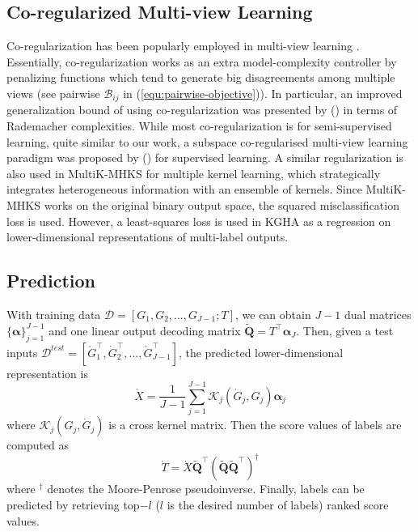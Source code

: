 \documentclass[a4paper]{article}
\begin{document}
\subsection{Co-regularized Multi-view Learning}
Co-regularization has been popularly employed in multi-view learning \cite{Farquhar_2005_NIPS,Brefeld_2006_ICML,Rosenberg_2007_AISTATS}. Essentially, co-regularization 
works as an extra model-complexity controller by penalizing functions which tend to generate big disagreements among multiple views (see pairwise $\mathcal{B}_{ij}$ in (\ref{equ:pairwise-objective})).   
In particular, an improved generalization bound of using co-regularization was presented by \citeauthor{Rosenberg_2007_AISTATS} (\citeyear{Rosenberg_2007_AISTATS}) in terms of Rademacher complexities.    
While most co-regularization is for semi-supervised learning, quite similar to our work,  a subspace co-regularised multi-view learning paradigm was proposed by \citeauthor{Guo_2012_ICML} (\citeyear{Guo_2012_ICML})
for supervised learning.
A similar regularization is also used in MultiK-MHKS \cite{MKL} for multiple kernel learning, which strategically integrates heterogeneous information with an 
ensemble of kernels. Since MultiK-MHKS works on the original binary output space, the squared misclassification loss is used. However, a least-squares loss is 
used in KGHA as a regression on lower-dimensional representations of multi-label outputs.      

\subsection{Prediction}
With training data $\mathcal{D}=[G_1,G_2,\ldots, G_{J-1}; T]$, we can obtain $J-1$ dual matrices $\{\boldsymbol{\alpha}\}_{j=1}^{J-1}$ and one linear 
output decoding matrix $\tilde{\mathbf{Q}}=T^\top \boldsymbol{\alpha}_J$.  
Then, given a test inputs $\mathcal{D}^{test}=[\dot{G}_1^\top,\dot{G}_2^\top,\ldots, \dot{G}_{J-1}^\top]$, the predicted lower-dimensional representation is
\begin{equation}
    \dot{X}=\frac{1}{J-1}\sum_{j=1}^{J-1} \mathcal{K}_j(\dot{G}_j, G_j)\boldsymbol{\alpha}_j  
\end{equation}
where $\mathcal{K}_j(G_j, \dot{G}_j )$ is a cross kernel matrix.  Then the score values of labels are computed as 
\begin{equation}
    \dot{T}=\dot{X}\tilde{\mathbf{Q}}^\top (\tilde{\mathbf{Q}}\tilde{\mathbf{Q}}^\top)^\dagger
    \label{equ:binary_prediction}
\end{equation}
where $^\dagger$ denotes the Moore-Penrose pseudoinverse. Finally, labels can be predicted by retrieving top$-l$ ($l$ is the desired number of labels) ranked score values. 
\end{document}
